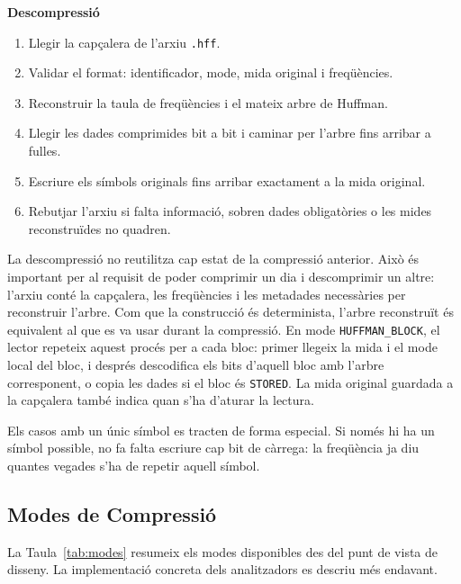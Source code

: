 \documentclass[conference,compsoc]{IEEEtran}
\begin{document}
\textbf{Descompressió}

\begin{enumerate}
    \item Llegir la capçalera de l'arxiu \texttt{.hff}.
    \item Validar el format: identificador, mode, mida original i
          freqüències.
    \item Reconstruir la taula de freqüències i el mateix arbre de
          Huffman.
    \item Llegir les dades comprimides bit a bit i caminar per l'arbre
          fins arribar a fulles.
    \item Escriure els símbols originals fins arribar exactament a la
          mida original.
    \item Rebutjar l'arxiu si falta informació, sobren dades obligatòries
          o les mides reconstruïdes no quadren.
\end{enumerate}

La descompressió no reutilitza cap estat de la compressió anterior. Això
és important per al requisit de poder comprimir un dia i descomprimir un
altre: l'arxiu conté la capçalera, les freqüències i les metadades
necessàries per reconstruir l'arbre. Com que la construcció és
determinista, l'arbre reconstruït és equivalent al que es va usar durant
la compressió. En mode \texttt{HUFFMAN\_BLOCK}, el lector repeteix aquest
procés per a cada bloc: primer llegeix la mida i el mode local del bloc,
i després descodifica els bits d'aquell bloc amb l'arbre corresponent, o
copia les dades si el bloc és \texttt{STORED}. La mida original guardada
a la capçalera també indica quan s'ha d'aturar la lectura.

Els casos amb un únic símbol es tracten de forma especial. Si només hi ha
un símbol possible, no fa falta escriure cap bit de càrrega: la freqüència
ja diu quantes vegades s'ha de repetir aquell símbol.

\subsection{Modes de Compressió}

La Taula~\ref{tab:modes} resumeix els modes disponibles des del punt de
vista de disseny. La implementació concreta dels analitzadors es descriu
més endavant.
\end{document}
